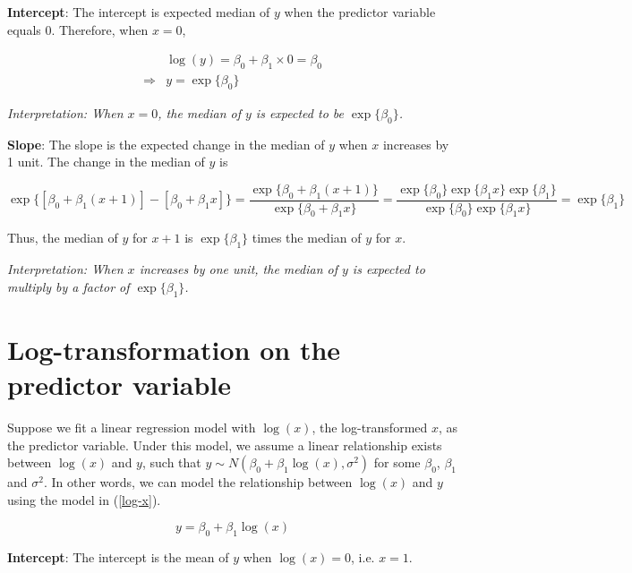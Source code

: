 \documentclass[]{book}
\begin{document}
\textbf{Intercept}: The intercept is expected median of \(y\) when the
predictor variable equals 0. Therefore, when \(x=0\),

\begin{equation}
\begin{aligned}
&\log(y) = \beta_0 + \beta_1 \times 0 = \beta_0 \\[10pt]
\Rightarrow &y = \exp\{\beta_0\}
\end{aligned}
\end{equation}

\emph{Interpretation: When \(x=0\), the median of \(y\) is expected to
be \(\exp\{\beta_0\}\).}

\textbf{Slope}: The slope is the expected change in the median of \(y\)
when \(x\) increases by 1 unit. The change in the median of \(y\) is

\begin{equation}
\exp\{[\beta_0 + \beta_1 (x+1)] - [\beta_0 + \beta_1 x]\} = \frac{\exp\{\beta_0 + \beta_1 (x+1)\}}{\exp\{\beta_0 + \beta_1 x\}} = \frac{\exp\{\beta_0\}\exp\{\beta_1 x\}\exp\{\beta_1\}}{\exp\{\beta_0\}\exp\{\beta_1 x\}} = \exp\{\beta_1\}
\end{equation}

Thus, the median of \(y\) for \(x+1\) is \(\exp\{\beta_1\}\) times the
median of \(y\) for \(x\).

\emph{Interpretation: When \(x\) increases by one unit, the median of
\(y\) is expected to multiply by a factor of \(\exp\{\beta_1\}\).}

\section{Log-transformation on the predictor
variable}\label{log-transformation-on-the-predictor-variable}

Suppose we fit a linear regression model with \(\log(x)\), the
log-transformed \(x\), as the predictor variable. Under this model, we
assume a linear relationship exists between \(\log(x)\) and \(y\), such
that \(y \sim N(\beta_0 + \beta_1 \log(x), \sigma^2)\) for some
\(\beta_0\), \(\beta_1\) and \(\sigma^2\). In other words, we can model
the relationship between \(\log(x)\) and \(y\) using the model in
(\ref{log-x}).

\begin{equation}
\label{log-x}
y = \beta_0 + \beta_1 \log(x)
\end{equation}

\textbf{Intercept}: The intercept is the mean of \(y\) when
\(\log(x) = 0\), i.e. \(x = 1\).
\end{document}

